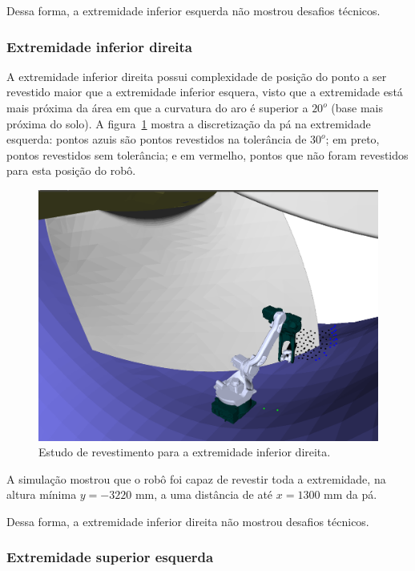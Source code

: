 Dessa forma, a extremidade inferior esquerda não mostrou desafios técnicos.

\subsubsection{Extremidade inferior direita}

A extremidade inferior direita possui complexidade de posição do ponto a
ser revestido maior que a extremidade inferior esquera, visto que a extremidade
está mais próxima da área em que a curvatura do aro é superior a $20^o$ (base
mais próxima do solo). A figura~\ref{fig::footright} mostra a discretização da
pá na extremidade esquerda: pontos azuis são pontos revestidos na tolerância de
$30^o$; em preto, pontos revestidos sem tolerância; e em vermelho, pontos que
não foram revestidos para esta posição do robô.

\begin{figure}[!ht]
	\centering	
	\includegraphics[width=1\columnwidth]{figs/footright.png}
	\caption{Estudo de revestimento para a extremidade inferior direita.}
	\label{fig::footright}
\end{figure}

A simulação mostrou que o robô foi capaz de revestir toda a extremidade, na
altura mínima $y=-3220$ mm, a uma distância de até $x=1300$ mm da pá. 

Dessa forma, a extremidade inferior direita não mostrou desafios técnicos.

\subsubsection{Extremidade superior esquerda}

